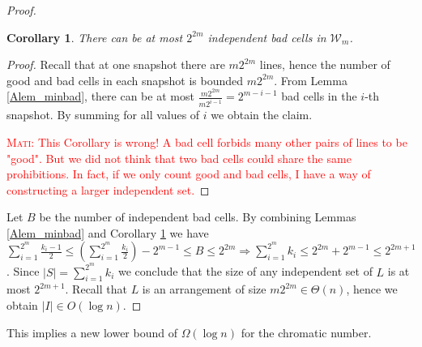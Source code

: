 \documentclass[11pt,a4paper]{article}
\newtheorem{corollary}[theorem]{Corollary}
\newcommand{\mati}[1]{\textcolor{red}{\textsc{Mati:} #1}}
\begin{document}
\begin{proof}
\begin{corollary}\label{Acor_maxbad}
There can be at most $2^{2m}$ independent bad cells in $\mathcal{W}_m$.
\end{corollary}
\begin{proof}
Recall that at one snapshot there are $m2^{2m}$ lines, hence the number of good and bad cells in each snapshot is bounded $m2^{2m}$. From Lemma \ref{Alem_minbad}, there can be at most $\frac{m2^{2m}}{m2^{i-1}}=2^{m-i-1}$ bad cells in the $i$-th snapshot. By summing for all values of $i$ we obtain the claim.

\mati{This Corollary is wrong! A bad cell forbids many other pairs of lines to be "good". But we did not think that two bad cells could share the same prohibitions. In fact, if we only count good and bad cells, I have a way of constructing a larger independent set.}
\end{proof}

Let $B$ be the number of independent bad cells. By combining Lemmas \ref{Alem_minbad} and Corollary \ref{Acor_maxbad} we have  $\sum_{i=1}^{2^m}\frac{k_i-1}{2}\leq(\sum_{i=1}^{2^m}\frac{k_i}{2})-2^{m-1}\leq B\leq 2^{2m} \Rightarrow \sum_{i=1}^{2^m}k_i \leq 2^{2m}+2^{m-1}\leq 2^{2m+1}$. Since $|S|=\sum_{i=1}^{2^m}k_i$ we conclude that the size of any independent set of $L$ is at most $2^{2m+1}$. Recall that $L$ is an arrangement of size $m2^{2m}\in \Theta(n)$, hence we obtain $|I|\in O(\log n)$.

\end{proof}

This implies a new lower bound of $\Omega (\log n)$ for the chromatic number.
\fi
\end{document}
